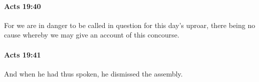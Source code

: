 		\paragraph{Acts 19:40} %
			\label{ACTS-19-40}

			For we are in danger to be called in question for this day's uproar, there being no cause whereby we may give an account of this concourse.

			\begin{framed}
			\scriptsize
				\begin{compactdesc}
					\item[SBLG] 
				\end{compactdesc}
			\end{framed}

		\paragraph{Acts 19:41} %
			\label{ACTS-19-41}

			And when he had thus spoken, he dismissed the assembly.

			\begin{framed}
			\scriptsize
				\begin{compactdesc}
					\item[SBLG] \gr{---}
				\end{compactdesc}
			\end{framed}

